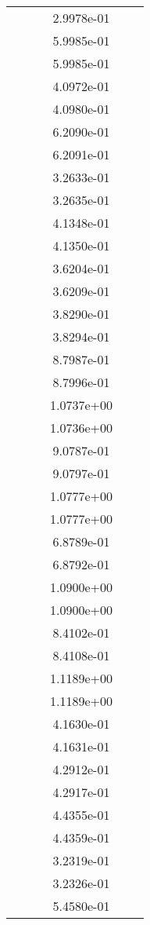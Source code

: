 \begin{xltabular}{\textwidth}{r|rS[table-format=1.3e+2]S[table-format=1.4e+2]S[table-format=1.4e+2]S[table-format=-1.5]}
&  &  & 2.9978e-01 & & \\
&  &  & 5.9985e-01 & & \\
&  &  & 5.9985e-01 & & \\
&  &  & 4.0972e-01 & & \\
&  &  & 4.0980e-01 & & \\
&  &  & 6.2090e-01 & & \\
&  &  & 6.2091e-01 & & \\
&  &  & 3.2633e-01 & & \\
&  &  & 3.2635e-01 & & \\
&  &  & 4.1348e-01 & & \\
&  &  & 4.1350e-01 & & \\
&  &  & 3.6204e-01 & & \\
&  &  & 3.6209e-01 & & \\
&  &  & 3.8290e-01 & & \\
&  &  & 3.8294e-01 & & \\
&  &  & 8.7987e-01 & & \\
&  &  & 8.7996e-01 & & \\
&  &  & 1.0737e+00 & & \\
&  &  & 1.0736e+00 & & \\
&  &  & 9.0787e-01 & & \\
&  &  & 9.0797e-01 & & \\
&  &  & 1.0777e+00 & & \\
&  &  & 1.0777e+00 & & \\
&  &  & 6.8789e-01 & & \\
&  &  & 6.8792e-01 & & \\
&  &  & 1.0900e+00 & & \\
&  &  & 1.0900e+00 & & \\
&  &  & 8.4102e-01 & & \\
&  &  & 8.4108e-01 & & \\
&  &  & 1.1189e+00 & & \\
&  &  & 1.1189e+00 & & \\
&  &  & 4.1630e-01 & & \\
&  &  & 4.1631e-01 & & \\
&  &  & 4.2912e-01 & & \\
&  &  & 4.2917e-01 & & \\
&  &  & 4.4355e-01 & & \\
&  &  & 4.4359e-01 & & \\
&  &  & 3.2319e-01 & & \\
&  &  & 3.2326e-01 & & \\
&  &  & 5.4580e-01 & & \\

\end{xltabular}
